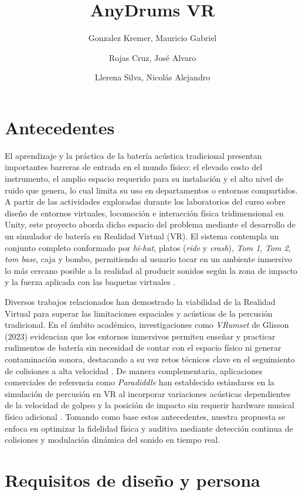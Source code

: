 \documentclass{article}
\title{AnyDrums VR}
\author{Gonzalez Kremer, Mauricio Gabriel \and Rojas Cruz, José Alvaro \and Llerena Silva, Nicolás Alejandro}
\begin{document}
\maketitle

\section{Antecedentes}

El aprendizaje y la práctica de la batería acústica tradicional presentan importantes barreras de entrada en el mundo físico: el elevado costo del instrumento, el amplio espacio requerido para su instalación y el alto nivel de ruido que genera, lo cual limita su uso en departamentos o entornos compartidos. A partir de las actividades exploradas durante los laboratorios del curso sobre diseño de entornos virtuales, locomoción e interacción física tridimensional en Unity, este proyecto aborda dicho espacio del problema mediante el desarrollo de un simulador de batería en Realidad Virtual (VR). El sistema contempla un conjunto completo conformado por \textit{hi-hat}, platos (\textit{ride} y \textit{crash}), \textit{Tom 1}, \textit{Tom 2}, \textit{tom base}, caja y bombo, permitiendo al usuario tocar en un ambiente inmersivo lo más cercano posible a la realidad al producir sonidos según la zona de impacto y la fuerza aplicada con las baquetas virtuales \cite{batery_asset, samples}.

Diversos trabajos relacionados han demostrado la viabilidad de la Realidad Virtual para superar las limitaciones espaciales y acústicas de la percusión tradicional. En el ámbito académico, investigaciones como \textit{VRumset} de Glisson (2023) evidencian que los entornos inmersivos permiten enseñar y practicar rudimentos de batería sin necesidad de contar con el espacio físico ni generar contaminación sonora, destacando a su vez retos técnicos clave en el seguimiento de colisiones a alta velocidad \cite{glisson2023}. De manera complementaria, aplicaciones comerciales de referencia como \textit{Paradiddle} han establecido estándares en la simulación de percusión en VR al incorporar variaciones acústicas dependientes de la velocidad de golpeo y la posición de impacto sin requerir hardware musical físico adicional \cite{paradiddle}. Tomando como base estos antecedentes, nuestra propuesta se enfoca en optimizar la fidelidad física y auditiva mediante detección continua de colisiones y modulación dinámica del sonido en tiempo real.

\section{Requisitos de diseño y persona}
\end{document}
